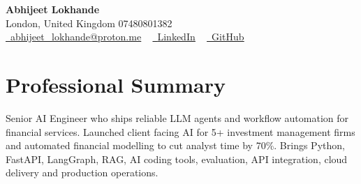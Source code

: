 \documentclass[a4paper,10pt]{article}
\begin{document}
    \begin{center}
        {\Huge\bfseries Abhijeet Lokhande}
        \\[2pt] {\color{muted}London, United Kingdom \textbar{} 07480801382}\\
        \small
        \href{mailto:abhijeet_lokhande@proton.me}{\raisebox{-0.2\height}{\color{primary}\faEnvelope}\  \underline{abhijeet\_lokhande@proton.me}} ~
        \href{https://www.linkedin.com/in/ablds/}{\raisebox{-0.2\height}{\color{primary}\faLinkedin}\ \underline{LinkedIn}}  ~
        \href{https://github.com/abhijeetscode}{\raisebox{-0.2\height}{\color{primary}\faGithub}\ \underline{GitHub}}
    \end{center}

\section{Professional Summary}
\vspace{-5pt}
{\color{muted}Senior AI Engineer who ships reliable LLM agents and workflow automation for financial services. Launched client facing AI for 5+ investment management firms and automated financial modelling to cut analyst time by 70\%. Brings Python, FastAPI, LangGraph, RAG, AI coding tools, evaluation, API integration, cloud delivery and production operations.}
\vspace{2pt}

\end{document}
